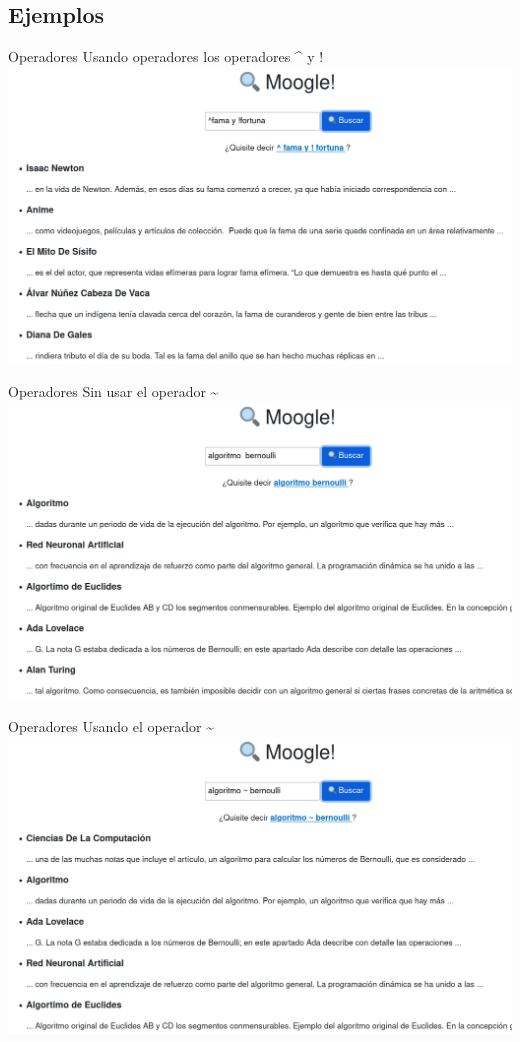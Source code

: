 \documentclass{beamer}
\begin{document}
\subsection{Ejemplos}

\begin{frame}{Operadores}
    Usando operadores los operadores \^{} y !\\
    \includegraphics[scale=0.2]{Imagenes/Operadores1.png}
\end{frame}

\begin{frame}{Operadores}
    Sin usar el operador \~{}\\
    \includegraphics[scale=0.2]{Imagenes/Operadores2.png}
\end{frame}
\begin{frame}{Operadores}
    Usando el operador \~{}\\
    \includegraphics[scale=0.2]{Imagenes/Operadores3.png}
\end{frame}
\end{document}
